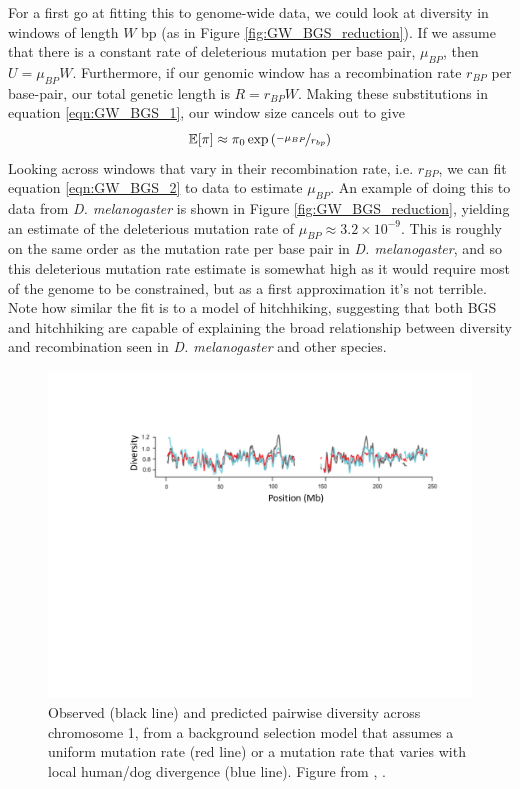 For a first go at fitting this to genome-wide data, we could look at
diversity in windows of length $W$ bp (as in Figure \ref{fig:GW_BGS_reduction}). If we assume that there is a constant rate of
deleterious mutation per base pair, $\mu_{BP}$, then $U=\mu_{BP}W$. Furthermore, if our genomic window has a
recombination rate $r_{BP}$ per base-pair, our total genetic length is
$R=r_{BP}W$. Making these substitutions in equation \eqref{eqn:GW_BGS_1}, our window size cancels out to give
\begin{equation}
  \mathbb{E}[\pi] \approx \pi_0 \exp \left(\nicefrac{-\mu_{BP}}{r_{bp}}
  \right) \label{eqn:GW_BGS_2}
 \end{equation}
Looking across windows that vary in their recombination rate,
i.e. $r_{BP}$, we can fit equation \eqref{eqn:GW_BGS_2} to data to
estimate $\mu_{BP}$. An example of doing this to data from {\it D. melanogaster}
  is shown in Figure
\ref{fig:GW_BGS_reduction}, yielding an estimate of the deleterious
mutation rate of $\mu_{BP}\approx
3.2 \times 10^{-9}$. This is roughly on the same order as the mutation
rate per base pair in  {\it D. melanogaster}, and so this deleterious mutation rate estimate is somewhat high as it
would require most of the genome to be constrained, but as a first
approximation it's not terrible. Note how similar the fit is to a model of
hitchhiking, suggesting that both BGS and hitchhiking are capable of explaining the
broad relationship between diversity and recombination seen in {\it D. melanogaster} and other species.


\begin{figure}
\begin{center}
\includegraphics[width=\textwidth]{Journal_figs/recom_selection/McVicker_human_BGS/McVicker_human_BGS.pdf}
\end{center}
\caption{Observed (black line) and predicted pairwise diversity across
  chromosome 1, from a background selection model that assumes a
  uniform mutation rate (red line) or a mutation rate that varies with
  local human/dog divergence (blue line). Figure from
  \citep{Mcvicker:09}, \PLOSccBY. } \label{fig:McVicker_BGS}
\end{figure}

